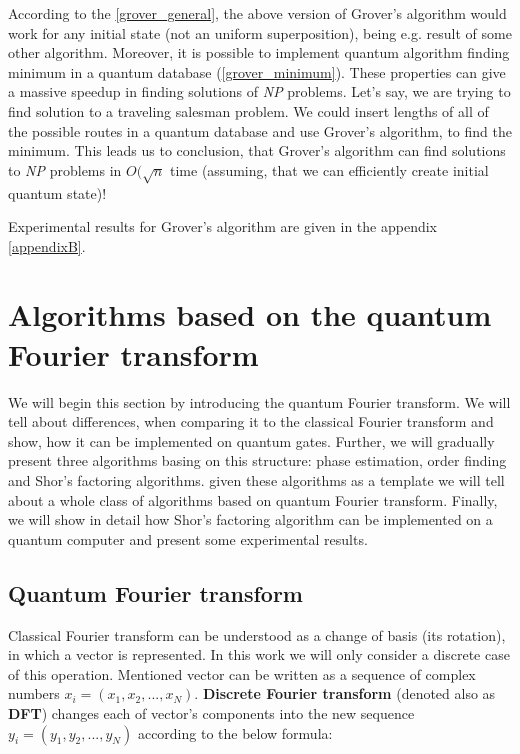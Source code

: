 \[\]

According to the \ref{grover_general}, the above version of Grover's algorithm would work for any initial state (not an uniform superposition), being e.g. result of some other algorithm. Moreover, it is possible to implement quantum algorithm finding minimum in a quantum database (\ref{grover_minimum}). These properties can give a massive speedup in finding solutions of \textit{NP} problems. Let's say, we are trying to find solution to a traveling salesman problem. We could insert lengths of all of the possible routes in a quantum database and use Grover's algorithm, to find the minimum. This leads us to conclusion, that Grover's algorithm can find solutions to \textit{NP} problems in $O(\sqrt{n}$ time (assuming, that we can efficiently create initial quantum state)!

Experimental results for Grover's algorithm are given in the appendix \ref{appendixB}.

\newpage
\section{Algorithms based on the quantum Fourier transform}

We will begin this section by introducing the quantum Fourier transform. We will tell about differences, when comparing it to the classical Fourier transform and show, how it can be implemented on quantum gates. Further, we will gradually present three algorithms basing on this structure: phase estimation, order finding and Shor's factoring algorithms. given these algorithms as a template we will tell about a whole class of algorithms based on quantum Fourier transform. Finally, we will show in detail how Shor's factoring algorithm can be implemented on a quantum computer and present some experimental results.

\subsection{Quantum Fourier transform}

Classical Fourier transform can be understood as a change of basis (its rotation), in which a vector is represented. In this work we will only consider a discrete case of this operation. Mentioned vector can be written as a sequence of complex numbers ${x_i} = (x_1, x_2, ..., x_N)$. \textbf{Discrete Fourier transform} (denoted also as \textbf{DFT}) changes each of vector's components into the new sequence ${y_i} = (y_1, y_2, ..., y_N)$ according to the below formula:

